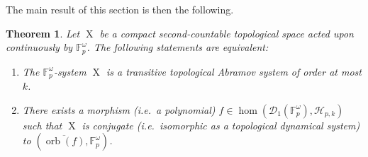 \documentclass[a4paper,12pt,reqno]{amsart}
\newtheorem{theorem}{Theorem}[section]
\theoremstyle{definition}
\newcommand{\mc}{\mathcal}
\newcommand{\mb}{\mathbb}
\DeclareMathOperator{\ns}{X}
\DeclareMathOperator{\orb}{orb}
\begin{document}
The main result of this section is then the following.

\begin{theorem}\label{thm:AbramovChar} 
Let $\ns$ be a compact second-countable topological space acted upon continuously by $\mb{F}_p^\omega$. The following statements are equivalent:
\setlength{\leftmargini}{0.8cm}
\begin{enumerate}
    \item The $\mb{F}_p^\omega$-system $\ns$ is a transitive topological Abramov system of order at most $k$.
    \item There exists a morphism \textup{(}i.e.\ a polynomial\textup{)} $f\in \hom(\mc{D}_1(\mb{F}_p^\omega),\mc{H}_{p,k})$ such that $\ns$ is conjugate \textup{(}i.e.\ isomorphic as a topological dynamical system\textup{)} to $(\overline{\orb(f)},\mb{F}_p^\omega)$.
\end{enumerate}
\end{theorem}
\end{document}
